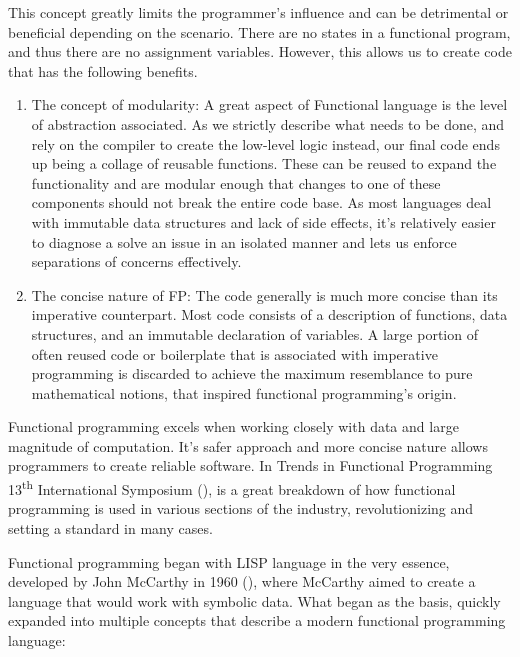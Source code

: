 This concept greatly limits the programmer's influence and can be detrimental or beneficial depending on the scenario. There are no states in a functional program, and thus there are no assignment variables. However, this allows us to create code that has the following benefits. \cite{hughes1989functional}
\begin{enumerate}
  \item The concept of modularity: 
        A great aspect of Functional language is the level of abstraction associated. As we strictly describe what needs to be done, and rely on the compiler to create the low-level logic instead, our final code ends up being a collage of reusable functions. These can be reused to expand the functionality and are modular enough that changes to one of these components should not break the entire code base. As most languages deal with immutable data structures and lack of side effects, it's relatively easier to diagnose a solve an issue in an isolated manner and lets us enforce separations of concerns effectively.
  \item The concise nature of FP:
        The code generally is much more concise than its imperative counterpart. Most code consists of a description of functions, data structures, and an immutable declaration of variables. A large portion of often reused code or boilerplate that is associated with imperative programming is discarded to achieve the maximum resemblance to pure mathematical notions, that inspired functional programming's origin. 
\end{enumerate}

Functional programming excels when working closely with data and large magnitude of computation. It's safer approach and more concise nature allows programmers to create reliable software. In Trends in Functional Programming 13\textsuperscript{th} International Symposium (\textcite{turner2004total}), is a great breakdown of how functional programming is used in various sections of the industry, revolutionizing and setting a standard in many cases.

Functional programming began with LISP language in the very essence, developed by John McCarthy in 1960 (\textcite{mccarthy1960lisp}), where McCarthy aimed to create a language that would work with symbolic data. What began as the basis, quickly expanded into multiple concepts that describe a modern functional programming language:

